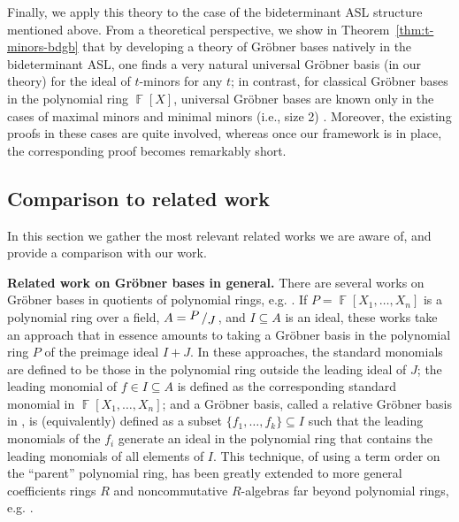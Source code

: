 \documentclass[11pt,reqno]{amsart}
\DeclareMathOperator{\F}{\mathbb{F}}
\newcommand{\bigslant}[2]{{\raisebox{.2em}{$#1$}\left/\raisebox{-.2em}{$#2$}\right.}}
\theoremstyle{definition}
\numberwithin{equation}{section}
\begin{document}
Finally, we apply this theory to the case of the bideterminant ASL structure mentioned above. 
From a theoretical perspective, we show in Theorem~\ref{thm:t-minors-bdgb} that by developing a theory of Gröbner bases natively in the bideterminant ASL, one finds a very natural universal Gröbner basis (in our theory) for the ideal of $t$-minors for any $t$; in contrast, for classical Gröbner bases in the polynomial ring $\F[X]$, universal Gröbner bases are known only in the cases of maximal minors \cite{sturmfels-maximal-1993,bernstein1993combinatorics} and minimal minors (i.e., size 2) \cite{sturmfels1996grobner}. Moreover, the existing proofs in these cases are quite involved, whereas once our framework is in place, the corresponding proof becomes remarkably short.

\subsection{Comparison to related work} \label{sec:related}

In this section we gather the most relevant related works we are aware of, and provide a comparison with our work. 

\textbf{Related work on Gröbner bases in general.} 
There are several works on Gröbner bases in quotients of polynomial rings, e.g. \cite{spear,zacharias,siebert,LaScalaStillman,HOS}. If $P = \F[X_1,\dotsc,X_n]$ is a polynomial ring over a field, $A = \bigslant{P}{J}$, and $I \subseteq A$ is an ideal, these works take an approach that in essence amounts to taking a Gröbner basis in the polynomial ring $P$ of the preimage ideal $I + J$. In these approaches, the standard monomials are defined to be those in the polynomial ring outside the leading ideal of $J$; the leading monomial of $f \in I \subseteq A$ is defined as the corresponding standard monomial in $\F[X_1,\dotsc,X_n]$; and a Gröbner basis, called a relative Gröbner basis in \cite{HOS}, is (equivalently) defined as a subset $\{f_1,\dotsc,f_k\} \subseteq I$ such that the leading monomials of the $f_i$ generate an ideal in the polynomial ring that contains the leading monomials of all elements of $I$. This technique, of using a term order on the ``parent'' polynomial ring, has been greatly extended to more general coefficients rings $R$ and noncommutative $R$-algebras far beyond polynomial rings, e.g. \cite{moraZacharias, reinert, KRW, saito1998grobner}. 
\end{document}
